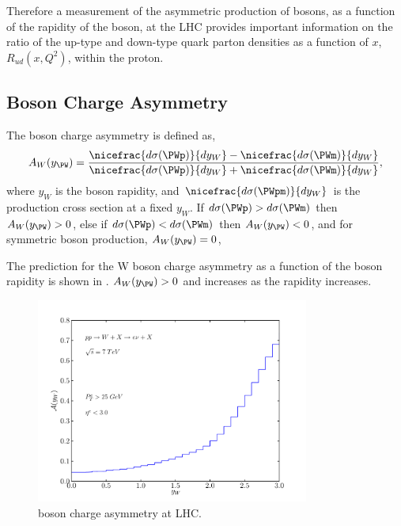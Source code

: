 Therefore a measurement of the asymmetric production of \PW bosons, as a
function of the rapidity of the boson, at the \ac{LHC} provides important
information on the ratio of the up-type and down-type quark parton densities as
a function of $x$,
$R_{ud}(x,Q^2)$, within the proton. 

\subsection{\PW Boson Charge Asymmetry}

The \PWpm boson charge asymmetry is defined as,
\begin{equation}
  A_{W}(y_{\PW})=
    \frac{ 
      \nicefrac{ d\sigma (\PWp) }{ dy_{W} } -
      \nicefrac{ d\sigma (\PWm) }{ dy_{W} }
    }
    {
      \nicefrac{ d\sigma (\PWp) }{ dy_{W} } +
      \nicefrac{ d\sigma (\PWm) }{ dy_{W} }
    }
,
\label{wbos:wasym}
\end{equation} 
where $y_{W}$ is the boson rapidity, and 
$\nicefrac{ d\sigma (\PWpm) }{ dy_{W} }$ is the \PWpm production cross section
at a fixed $y_{W}$.  
If $d\sigma(\PWp) > d\sigma(\PWm) $ then $A_{W}(y_{\PW})> 0$,
else if $d\sigma(\PWp) < d\sigma(\PWm) $ then $A_{W}(y_{\PW})< 0$,
and for symmetric \PWpm boson production, $A_{W}(y_{\PW})= 0$,

The prediction for the W boson charge asymmetry as a function of the boson
rapidity is shown in . $A_{W}(y_{\PW})> 0$ and
increases as the rapidity increases.

\begin{figure}[htbp]
  \centering
  \includegraphics[width=0.8\textwidth]{w-asym}
  \caption{\PW boson charge asymmetry at LHC.}
  \label{wbos:chargeasym}
\end{figure}

